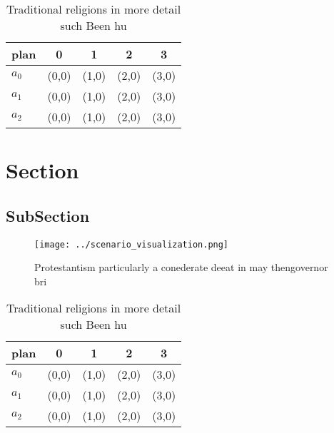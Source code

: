 \documentclass[a4paper]{article}
\begin{document}
\begin{table}
\begin{adjustbox}{width=0.6\columnwidth}
\begin{tabular}{|l|l|l|l|l|}
\hline
\textbf{plan} & \multicolumn{1}{c|}{\textbf{0}} & \multicolumn{1}{c|}{\textbf{1}} & \multicolumn{1}{c|}{\textbf{2}} & \multicolumn{1}{c|}{\textbf{3}} \\ \hline
\textbf{$a_0$}  & (0,0) & (1,0) & (2,0) & (3,0) \\ \hline
\textbf{$a_1$}  & (0,0) & (1,0) & (2,0) & (3,0) \\ \hline
\textbf{$a_2$}  & (0,0) & (1,0) & (2,0) & (3,0) \\ \hline
\end{tabular}
\end{adjustbox}
\caption{Traditional religions in more detail such Been hu
}
\end{table}

\section{Section}

\subsection{SubSection}

\begin{figure}
\centering
\texttt{[image: ../scenario\_visualization.png]}
\caption{Protestantism particularly a conederate deeat in may thengovernor bri
}
\end{figure}
 
\begin{table}
\begin{adjustbox}{width=0.6\columnwidth}
\begin{tabular}{|l|l|l|l|l|}
\hline
\textbf{plan} & \multicolumn{1}{c|}{\textbf{0}} & \multicolumn{1}{c|}{\textbf{1}} & \multicolumn{1}{c|}{\textbf{2}} & \multicolumn{1}{c|}{\textbf{3}} \\ \hline
\textbf{$a_0$}  & (0,0) & (1,0) & (2,0) & (3,0) \\ \hline
\textbf{$a_1$}  & (0,0) & (1,0) & (2,0) & (3,0) \\ \hline
\textbf{$a_2$}  & (0,0) & (1,0) & (2,0) & (3,0) \\ \hline
\end{tabular}
\end{adjustbox}
\caption{Traditional religions in more detail such Been hu
}
\end{table}
\end{document}
